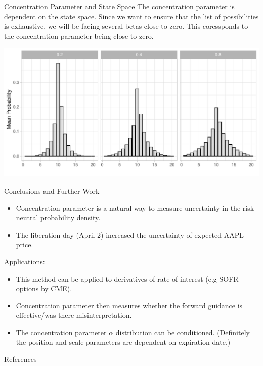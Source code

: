 \documentclass[10pt,aspectratio=43]{beamer}
\begin{document}
\begin{frame}{Concentration Parameter and State Space}
    The concentration parameter is dependent on the state space. Since we want to ensure that the list of possibilities is exhaustive, we will be facing several betas close to zero. This coressponds to the concentration parameter being close to zero.
    
    \begin{center}
        \includegraphics[width=0.9\linewidth]{dirichlet_histogram.pdf}
    \end{center}
\end{frame}


\begin{frame}{Conclusions and Further Work}
    \begin{itemize}
        \item Concentration parameter is a natural way to measure uncertainty in the risk-neutral probability density.
        \item The liberation day (April 2) increased the uncertainty of expected AAPL price.
    \end{itemize}

Applications:
\begin{itemize}
    \item This method can be applied to derivatives of rate of interest (e.g SOFR options by CME).
    \item Concentration parameter then measures whether the forward guidance is effective/was there misinterpretation.
\end{itemize}
\begin{itemize}
    \item The concentration parameter $\alpha$ distribution can be conditioned. (Definitely the position and scale parameters are dependent on expiration date.)
\end{itemize}

\end{frame}



\lastslide

\begin{frame}[allowframebreaks]{References}
    \renewcommand*{\bibfont}{\scriptsize}
    \printbibliography
\end{frame}


    
\end{document}
